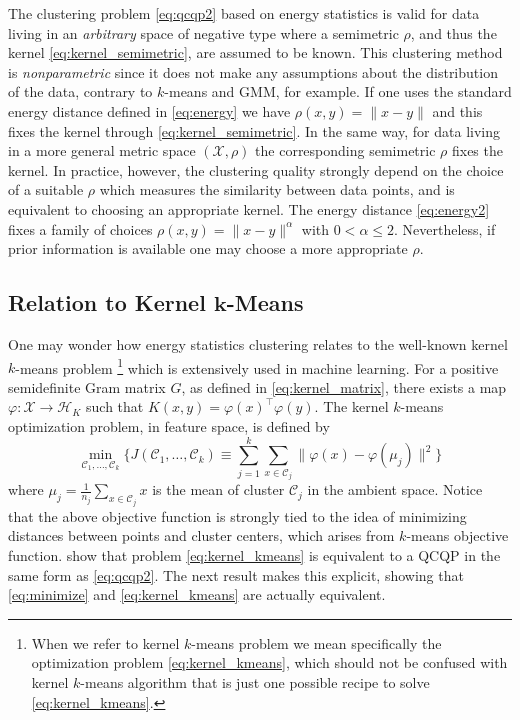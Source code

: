 \documentclass[aps,preprint,nofootinbib,floatfix]{revtex4-1}
\newcommand\kk{K}
\newcommand\HH{\mathcal{H}}
\newcommand\C{{\mathcal{C}}}
\begin{document}
The clustering problem \eqref{eq:qcqp2} based on energy statistics
is valid for data living in an \emph{arbitrary} space of negative type where
a semimetric $\rho$, and thus the kernel \eqref{eq:kernel_semimetric}, are
assumed to be known. This clustering method is
\emph{nonparametric} since it does not make any assumptions
about  the distribution of the data, 
contrary to $k$-means and GMM, for example.
If one uses the standard energy distance
defined in \eqref{eq:energy} 
we have $\rho(x,y) = \| x - y\|$ and this fixes the kernel
through \eqref{eq:kernel_semimetric}. In the same way, 
for data living in a more general
metric space $(\mathcal{X}, \rho)$ the corresponding semimetric $\rho$ fixes
the kernel.
In practice, however,
the clustering quality strongly depend on the choice of a suitable
$\rho$ which measures the similarity between data points,
and is equivalent to choosing an appropriate kernel.
The energy distance \eqref{eq:energy2} fixes a family of choices
$\rho(x,y) = \| x-y\|^\alpha$ with $0 < \alpha\le 2$. 
Nevertheless, if prior information
is available one may choose a more appropriate $\rho$.

\subsection*{Relation to Kernel $\bm{k}$-Means}
One may wonder how energy statistics clustering 
relates to the well-known kernel $k$-means problem%
\footnote{When we refer to kernel $k$-means problem we mean specifically 
the optimization problem \eqref{eq:kernel_kmeans}, which should not be 
confused with kernel $k$-means algorithm that is just one possible recipe 
to solve \eqref{eq:kernel_kmeans}.
} 
which is extensively used in machine learning.
For a positive semidefinite Gram matrix $G$, as defined in
\eqref{eq:kernel_matrix},
there exists a map
$\varphi: \mathcal{X} \to \HH_\kk$ such that
$\kk(x,y) = \varphi(x)^\top \varphi(y)$. The kernel $k$-means optimization
problem,
in feature space,
is defined by
\begin{equation}
\label{eq:kernel_kmeans}
\min_{\C_1,\dotsc,\C_k}\bigg\{ 
J(\C_1,\dots,\C_k) \equiv  \sum_{j=1}^k
\sum_{x \in \C_j} \| \varphi(x) - \varphi(\mu_j) \|^2
\bigg\}
\end{equation}
where $\mu_j = \tfrac{1}{n_j} \sum_{x \in \C_j} x$ is the  mean of cluster
$\C_j$ in the ambient space. Notice that the above objective function
is strongly tied to the idea of minimizing distances between points
and cluster centers, which arises from $k$-means objective function.
 \cite{Dhillon2,Dhillon} show
that problem \eqref{eq:kernel_kmeans} 
is equivalent to a QCQP in the same form as
\eqref{eq:qcqp2}. The next result makes this explicit, showing that
\eqref{eq:minimize} and \eqref{eq:kernel_kmeans} are actually equivalent.
\end{document}
